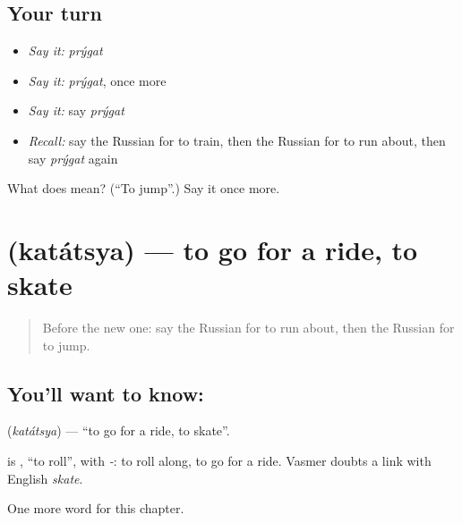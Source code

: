 \subsection*{Your turn}
\begin{itemize}
\raggedright
  \item \emph{Say it:} \emph{prýgat}
  \item \emph{Say it:} \emph{prýgat}, once more
  \item \emph{Say it:} say \emph{prýgat}
  \item \emph{Recall:} say the Russian for to train, then the Russian for to run about, then say \emph{prýgat} again
\end{itemize}

\begin{tcolorbox}[breakable,colback=teal!4,colframe=teal!35!black,title={Before you move on}]
What does  mean? (\textquotedblleft{}To jump\textquotedblright{}.) Say it once more.
\end{tcolorbox}
\section[\texorpdfstring{\ru{кататься} (katátsya)}{кататься (katátsya)}]{ (katátsya) — to go for a ride, to skate}

\label{lesson:RU-C178-katatsya}



\begin{quote}
Before the new one: say the Russian for to run about, then the Russian for to jump.
\end{quote}

\subsection*{You'll want to know: }
\textbf{} (\emph{katátsya}) — \textquotedblleft{}to go for a ride, to skate\textquotedblright{}.

\begin{cousinweb}
\textbf{} is \emph{}, \textquotedblleft{}to roll\textquotedblright{}, with \emph{-}: to roll along, to go for a ride. Vasmer doubts a link with English \emph{skate}.
\end{cousinweb}

\begin{grammarlens}[title={What you've built}]
One more word for this chapter.
\end{grammarlens}

